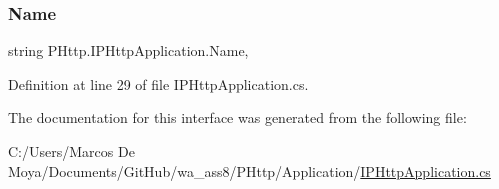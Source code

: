 \subsubsection{\texorpdfstring{Name}{Name}}
{\footnotesize\ttfamily string P\+Http.\+I\+P\+Http\+Application.\+Name\hspace{0.3cm}{\ttfamily [get]}, {\ttfamily [set]}}



Definition at line 29 of file I\+P\+Http\+Application.\+cs.



The documentation for this interface was generated from the following file\+:\begin{DoxyCompactItemize}
\item 
C\+:/\+Users/\+Marcos De Moya/\+Documents/\+Git\+Hub/wa\+\_\+ass8/\+P\+Http/\+Application/\hyperlink{_i_p_http_application_8cs}{I\+P\+Http\+Application.\+cs}\end{DoxyCompactItemize}
